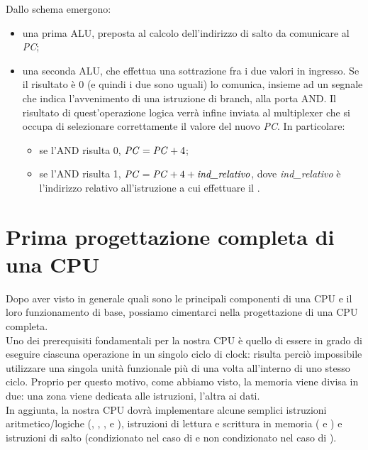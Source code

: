 Dallo schema emergono:
\begin{itemize}
	\item una prima ALU, preposta al calcolo dell'indirizzo di salto da comunicare al \emph{PC};
	\item una seconda ALU, che effettua una sottrazione fra i due valori in ingresso. Se il risultato è 0 (e quindi i due sono uguali) lo comunica, insieme ad un segnale che indica l'avvenimento di una istruzione di branch, alla porta AND. Il risultato di quest'operazione logica verrà infine inviata al multiplexer che si occupa di selezionare correttamente il valore del nuovo \emph{PC}. In particolare:
	\begin{itemize}
		\item se l'AND risulta 0, \(\textrm{\emph{PC}}=\textrm{\emph{PC}}+4\);
		\item se l'AND risulta 1, \(\textrm{\emph{PC}}=\textrm{\emph{PC}}+4+\textrm{\emph{ind\_relativo}}\), dove \emph{ind\_relativo} è l'indirizzo relativo all'istruzione a cui effettuare il .
	\end{itemize}
\end{itemize}

\section{Prima progettazione completa di una CPU}
Dopo aver visto in generale quali sono le principali componenti di una CPU e il loro funzionamento di base, possiamo cimentarci nella progettazione di una CPU completa.\\
Uno dei prerequisiti fondamentali per la nostra CPU è quello di essere in grado di eseguire ciascuna operazione in un singolo ciclo di clock: risulta perciò impossibile utilizzare una singola unità funzionale più di una volta all'interno di uno stesso ciclo. Proprio per questo motivo, come abbiamo visto, la memoria viene divisa in due: una zona viene dedicata alle istruzioni, l'altra ai dati.\\
In aggiunta, la nostra CPU dovrà implementare alcune semplici istruzioni aritmetico/logiche (, , ,  e ), istruzioni di lettura e scrittura in memoria ( e ) e istruzioni di salto (condizionato nel caso di  e non condizionato nel caso di ).

